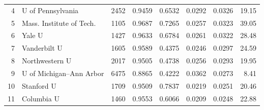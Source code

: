 \documentclass[12pt]{article}
\numberwithin{equation}{subsection}
\theoremstyle{definition}
\begin{document}
\begin{table}[]
\begin{tabular}{r|lrrrrrr}
4             & U of Pennsylvania                     & 2452            & 0.9459                                                         & 0.6532         & 0.0292              & 0.0326                                                                   & 19.15                                                                    \\
5             & Mass. Institute of Tech. & 1105            & 0.9687                                                         & 0.7265         & 0.0257              & 0.0323                                                                   & 39.05                                                                    \\
6             & Yale U                                & 1427            & 0.9633                                                         & 0.6784         & 0.0261              & 0.0322                                                                   & 28.48                                                                    \\
7             & Vanderbilt U                          & 1605            & 0.9589                                                         & 0.4375         & 0.0246              & 0.0297                                                                   & 24.59                                                                    \\
8             & Northwestern U                        & 2017            & 0.9505                                                         & 0.4738         & 0.0256              & 0.0293                                                                   & 19.95                                                                    \\
9             & U of Michigan--Ann Arbor               & 6475            & 0.8865                                                         & 0.4222         & 0.0362              & 0.0273                                                                   & 8.41                                                                     \\
10            & Stanford U                            & 1709            & 0.9509                                                         & 0.7837         & 0.0219              & 0.0251                                                                   & 20.46                                                                    \\
11            & Columbia U    & 1460            & 0.9553                                                         & 0.6066         & 0.0209              & 0.0248                                                                   & 22.88                                                                    \\

\end{tabular}
\end{table}
\end{document}
